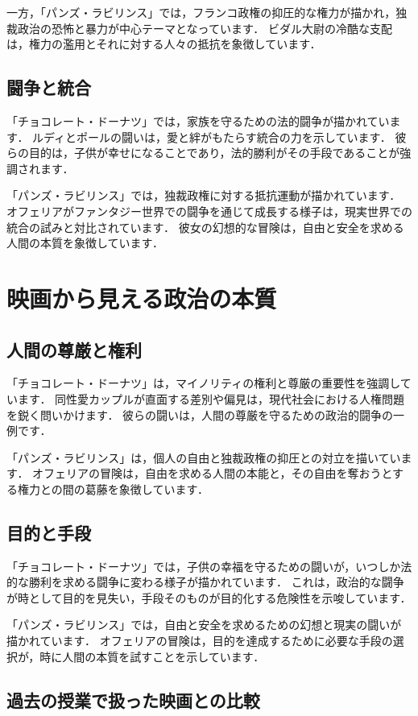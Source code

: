 \documentclass[titlepage,a4paper]{jsarticle}
\begin{document}
一方，「パンズ・ラビリンス」では，フランコ政権の抑圧的な権力が描かれ，独裁政治の恐怖と暴力が中心テーマとなっています．
ビダル大尉の冷酷な支配は，権力の濫用とそれに対する人々の抵抗を象徴しています．
\subsection{闘争と統合}
「チョコレート・ドーナツ」では，家族を守るための法的闘争が描かれています．
ルディとポールの闘いは，愛と絆がもたらす統合の力を示しています．
彼らの目的は，子供が幸せになることであり，法的勝利がその手段であることが強調されます．

「パンズ・ラビリンス」では，独裁政権に対する抵抗運動が描かれています．
オフェリアがファンタジー世界での闘争を通じて成長する様子は，現実世界での統合の試みと対比されています．
彼女の幻想的な冒険は，自由と安全を求める人間の本質を象徴しています．
\section{映画から見える政治の本質}
\subsection{人間の尊厳と権利}
「チョコレート・ドーナツ」は，マイノリティの権利と尊厳の重要性を強調しています．
同性愛カップルが直面する差別や偏見は，現代社会における人権問題を鋭く問いかけます．
彼らの闘いは，人間の尊厳を守るための政治的闘争の一例です．

「パンズ・ラビリンス」は，個人の自由と独裁政権の抑圧との対立を描いています．
オフェリアの冒険は，自由を求める人間の本能と，その自由を奪おうとする権力との間の葛藤を象徴しています．

\subsection{目的と手段}
「チョコレート・ドーナツ」では，子供の幸福を守るための闘いが，いつしか法的な勝利を求める闘争に変わる様子が描かれています．
これは，政治的な闘争が時として目的を見失い，手段そのものが目的化する危険性を示唆しています．

「パンズ・ラビリンス」では，自由と安全を求めるための幻想と現実の闘いが描かれています．
オフェリアの冒険は，目的を達成するために必要な手段の選択が，時に人間の本質を試すことを示しています．

\subsection{過去の授業で扱った映画との比較}
\end{document}
